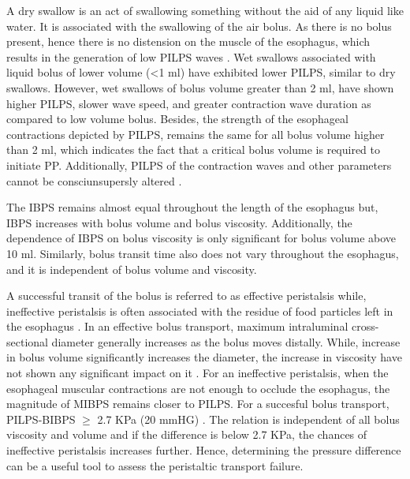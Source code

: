 A dry swallow is an act of swallowing something without the aid of any liquid like water. It is associated with the swallowing of the air bolus. As there is no bolus present, hence there is no distension on the muscle of the esophagus, which results in the generation of low \ac{PILPS} waves \cite{hollis1975effect}. Wet swallows associated with liquid bolus of lower volume (<1 ml) have exhibited lower \ac{PILPS}, similar to dry swallows. However, wet swallows of bolus volume greater than 2 ml, have shown higher \ac{PILPS}, slower wave speed, and greater contraction wave duration as compared to low volume bolus. Besides, the strength of the esophageal contractions depicted by \ac{PILPS}, remains the same for all bolus volume higher than 2 ml, which indicates the fact that a critical bolus volume is required to initiate \ac{PP}. Additionally, \ac{PILPS} of the contraction waves and other parameters cannot be consciunsupersly altered \cite{hollis1975effect}. 

The \ac{IBPS} remains almost equal throughout the length of the esophagus but, \ac{IBPS} increases with bolus volume and bolus viscosity. Additionally, the dependence of \ac{IBPS} on bolus viscosity is only significant for bolus volume above 10 ml. Similarly, bolus transit time also does not vary throughout the esophagus, and it is independent of bolus volume and viscosity. 

A successful transit of the bolus is referred to as effective
peristalsis while, ineffective peristalsis is often associated with
the residue of food particles left in the esophagus \citep{ghosh2006physiology}. In an effective bolus transport, maximum intraluminal cross-sectional diameter generally increases as the bolus moves distally. While, increase in bolus volume significantly increases the diameter, the increase in viscosity have not shown any significant impact on it \cite{ren1993determinants}. For an ineffective peristalsis, when the esophageal muscular contractions are not enough to occlude the esophagus, the magnitude of \ac{MIBPS} remains closer to \ac{PILPS}. For a succesful bolus transport, \ac{PILPS}-\ac{BIBPS} $  \ge$ 2.7 KPa (20 mmHG) \cite{ren1993determinants,ghosh2006physiology}. The relation is independent of all bolus viscosity and volume and if the difference is below 2.7 KPa, the chances of ineffective peristalsis increases further. Hence, determining the pressure difference can be a useful tool to assess the peristaltic transport failure.

